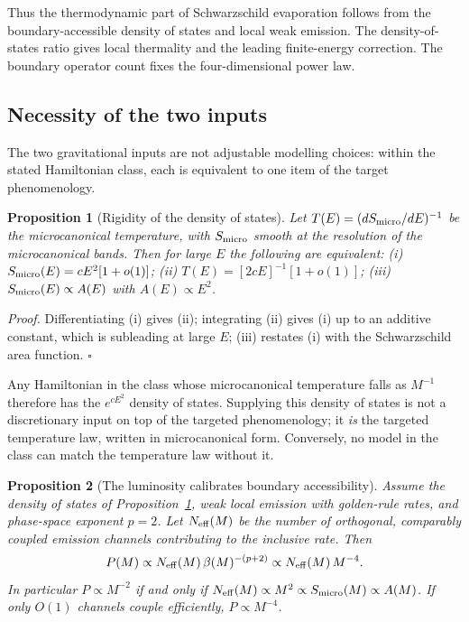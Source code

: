 \documentclass[12pt]{article}
\newcommand{\Smicro}{S_{\rm micro}}
\newtheorem{proposition}{Proposition}
\begin{document}
Thus the thermodynamic part of Schwarzschild evaporation follows from the
boundary-accessible density of states and local weak emission.  The
density-of-states ratio gives local thermality and the leading finite-energy
correction.  The boundary operator count fixes the four-dimensional power law.

\subsection{Necessity of the two inputs}
\label{sec:necessity}

The two gravitational inputs are not adjustable modelling choices: within the
stated Hamiltonian class, each is equivalent to one item of the target
phenomenology.

\begin{proposition}[Rigidity of the density of states]
\label{prop:dos}
Let $T(E)=(d\Smicro/dE)^{-1}$ be the microcanonical temperature, with
$\Smicro$ smooth at the resolution of the microcanonical bands.  Then for
large $E$ the following are equivalent: (i) $\Smicro(E)=cE^2[1+o(1)]$;
(ii) $T(E)=[2cE]^{-1}[1+o(1)]$; (iii) $\Smicro(E)\propto A(E)$ with
$A(E)\propto E^2$.
\end{proposition}

\emph{Proof.}  Differentiating (i) gives (ii); integrating (ii) gives (i) up
to an additive constant, which is subleading at large $E$; (iii) restates (i)
with the Schwarzschild area function.  \hfill$\square$

Any Hamiltonian in the class whose microcanonical temperature falls as
$M^{-1}$ therefore has the $e^{cE^2}$ density of states.  Supplying this
density of states is not a discretionary input on top of the targeted
phenomenology; it \emph{is} the targeted temperature law, written in
microcanonical form.  Conversely, no model in the class can match the
temperature law without it.

\begin{proposition}[The luminosity calibrates boundary accessibility]
\label{prop:area}
Assume the density of states of Proposition~\ref{prop:dos}, weak local
emission with golden-rule rates, and phase-space exponent $p=2$.  Let
$N_{\rm eff}(M)$ be the number of orthogonal, comparably coupled emission
channels contributing to the inclusive rate.  Then
\begin{equation}
    P(M)\propto N_{\rm eff}(M)\,\beta(M)^{-(p+2)}
    \propto N_{\rm eff}(M)\,M^{-4}.
\end{equation}
In particular $P\propto M^{-2}$ if and only if
$N_{\rm eff}(M)\propto M^2\propto\Smicro(M)\propto A(M)$.  If only $O(1)$
channels couple efficiently, $P\propto M^{-4}$.
\end{proposition}
\end{document}
